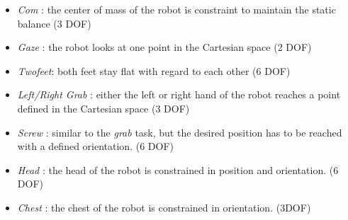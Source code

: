 \documentclass[letterpaper, 10pt, conference]{ieeeconf}      %
\begin{document}
\begin{itemize}
  \item \emph{Com} : the center of mass of the robot is constraint to maintain the static balance (3 DOF)
  \item \emph{Gaze} : the robot looks at one point in the Cartesian space (2 DOF)
  \item \emph{Twofeet}: both feet stay flat with regard to each other (6 DOF)
  \item \emph{Left/Right Grab} : either the left or right hand
of the robot reaches a point defined in the Cartesian space (3 DOF)
  \item \emph{Screw} : similar to the \emph{grab} task, but the desired position 
has to be reached with a defined orientation. (6 DOF)
  \item \emph{Head} : the head of the robot is constrained in position and orientation. (6 DOF)
  \item \emph{Chest} : the chest of the robot is constrained in orientation.  (3DOF)
\end{itemize}
\end{document}
